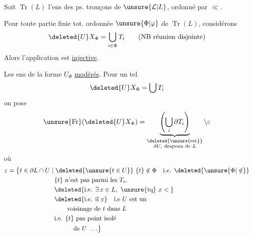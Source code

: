 
Soit $\operatorname{Tr}(L)$ l'ens  des ps. tronçons de $\unsure{\mathcal L|L}$, ordonné par $\ll$.

Pour toute partie finie tot. ordonnée $\unsure{\Phi|\varphi}$ de $\operatorname{Tr}(L)$, considérons
\[
\deleted{U}X_{\Phi}=\bigcup_{i\in\Phi}T_i\qquad\text{(NB réunion disjointe)}
\]
Alors l'application
est \uline{injective}.

Les ens de la forme $U_{\Phi}$  \uline{modérés}. Pour un tel
\[
\deleted{U}X_{\Phi}=\bigcup T_i
\]
on pose
\[
\unsure{\operatorname{Fr}}(\deleted{U}X_{\Phi})=
\underbrace{\left(\bigcup_i\partial T_i\right)}_{\substack{\deleted{\text{\unsure{est}}}\\\partial U,\ \text{drapeau de } L}}\setminus\varepsilon
\]
où
\[
\begin{aligned}
\varepsilon={}&\bigl\{t\in\partial L\cap U\mid
  \deleted{\unsure{t\in U}}\ \{t\}\notin\Phi\quad\text{i.e. }\deleted{\unsure{\Phi|\notin}}\\
&\hspace{6em}\{t\}\text{ n'est pas parmi les }T_i,\\
&\hspace{6em}\deleted{\text{i.e. }\exists\,x\in L,\ \text{\unsure{tq} } x<{}}\\
&\hspace{6em}\deleted{\text{i.e. il y}}\quad\text{i.e }U\text{ est un}\\
&\hspace{8em}\text{voisinage de }t\text{ dans } L\\
&\hspace{6em}\text{i.e. }\{t\}\text{ pas point isolé}\\
&\hspace{9em}\text{de }U\ \ldots\bigr\}
\end{aligned}
\]
